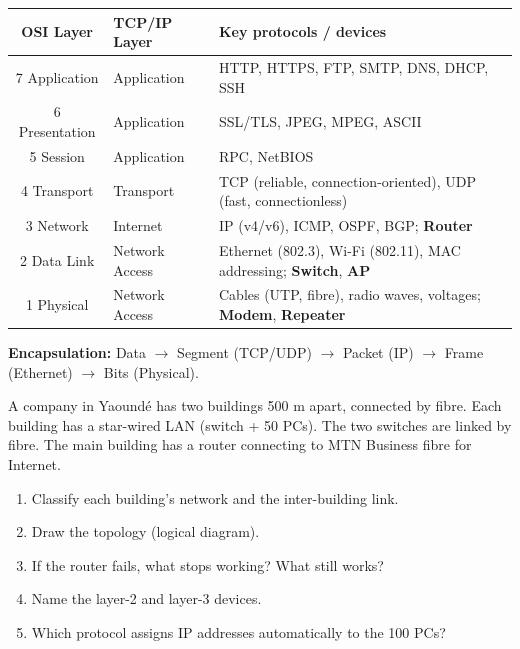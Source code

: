\documentclass[11pt]{article}
\begin{document}
\begin{aretenir}
\begin{center}
\begin{tabularx}{\linewidth}{|c|X|X|}
\hline
\rowcolor{popblueL} \textbf{OSI Layer} & \textbf{TCP/IP Layer} & \textbf{Key protocols / devices} \\
\hline
7 Application & Application & HTTP, HTTPS, FTP, SMTP, DNS, DHCP, SSH \\
6 Presentation & Application & SSL/TLS, JPEG, MPEG, ASCII \\
5 Session & Application & RPC, NetBIOS \\
\hline
4 Transport & Transport & TCP (reliable, connection-oriented), UDP (fast, connectionless) \\
\hline
3 Network & Internet & IP (v4/v6), ICMP, OSPF, BGP; \textbf{Router} \\
\hline
2 Data Link & Network Access & Ethernet (802.3), Wi-Fi (802.11), MAC addressing; \textbf{Switch}, \textbf{AP} \\
1 Physical & Network Access & Cables (UTP, fibre), radio waves, voltages; \textbf{Modem}, \textbf{Repeater} \\
\hline
\end{tabularx}
\end{center}
\textbf{Encapsulation:} Data $\rightarrow$ Segment (TCP/UDP) $\rightarrow$ Packet (IP) $\rightarrow$ Frame (Ethernet) $\rightarrow$ Bits (Physical).
\end{aretenir}

\begin{exercice}
A company in Yaoundé has two buildings 500 m apart, connected by fibre. Each building has a star-wired LAN (switch + 50 PCs). The two switches are linked by fibre. The main building has a router connecting to MTN Business fibre for Internet.
\begin{enumerate}
\item Classify each building's network and the inter-building link.
\item Draw the topology (logical diagram).
\item If the router fails, what stops working? What still works?
\item Name the layer-2 and layer-3 devices.
\item Which protocol assigns IP addresses automatically to the 100 PCs?
\end{enumerate}
\end{exercice}
\end{document}
